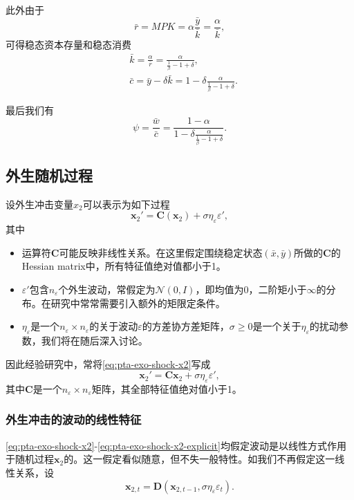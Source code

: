 此外由于
\begin{equation*}
  \bar{r} = MPK = \alpha \frac{\bar{y}}{\bar{k}} = \frac{\alpha}{\bar{k}},
\end{equation*}
可得稳态资本存量和稳态消费
\begin{align*}
  &\bar{k} = \frac{\alpha}{\bar{r}} = \frac{\alpha}{\frac{1}{\beta} - 1 + \delta}, \\
  &\bar{c} = \bar{y} - \delta \bar{k} = 1 - \delta \frac{\alpha}{\frac{1}{\beta} - 1 + \delta}.
\end{align*}

最后我们有
\begin{equation*}
  \psi = \frac{\bar{w}}{\bar{c}} = \frac{
  1-\alpha
  }{
  1 - \delta \frac{\alpha}{\frac{1}{\beta} - 1 + \delta}
  }.
\end{equation*}

\subsection{外生随机过程}
设外生冲击变量$x_2$可以表示为如下过程
\begin{equation}
  \label{eq:pta-exo-shock-x2}
  \bm{x}_2' = \bm{C}(\bm{x}_2) + \sigma \eta_{\varepsilon} \varepsilon ',
\end{equation}
其中
\begin{itemize}
  \item 运算符$\bm{C}$可能反映非线性关系。在这里假定围绕稳定状态$(\bar{x}, \bar{y})$所做的$\bm{C}$的Hessian matrix中，所有特征值绝对值都小于1。
  \item $\varepsilon '$包含$n_{\varepsilon}$个外生波动，常假定为$\mathcal{N}(0,I)$，即均值为0，二阶矩小于$\infty$的分布。在研究中常常需要引入额外的矩限定条件。
  \item $\eta_{\varepsilon}$是一个$n_{\varepsilon} \times n_{\varepsilon}$的关于波动$\varepsilon$的方差协方差矩阵，$\sigma \ge 0$是一个关于$\eta_{\varepsilon}$的扰动参数\citep{SchmittGroh:2004da}，我们将在随后深入讨论。
\end{itemize}

因此经验研究中，常将\eqref{eq:pta-exo-shock-x2}写成
\begin{equation}
  \label{eq:pta-exo-shock-x2-explicit}
  \bm{x}_2' = \bm{C} \bm{x}_2 + \sigma \eta_{\varepsilon} \varepsilon ',
\end{equation}
其中$\bm{C}$是一个$n_{\varepsilon} \times n_{\varepsilon}$矩阵，其全部特征值绝对值小于1。

\subsubsection{外生冲击的波动的线性特征}
\eqref{eq:pta-exo-shock-x2}-\eqref{eq:pta-exo-shock-x2-explicit}均假定波动是以线性方式作用于随机过程$\bm{x}_2$的。这一假定看似随意，但不失一般特性。如我们不再假定这一线性关系，设
\begin{equation*}
  \bm{x}_{2,t} = \bm{D}(\bm{x}_{2,t-1}, \sigma \eta_{\varepsilon} \varepsilon_{t}).
\end{equation*}

